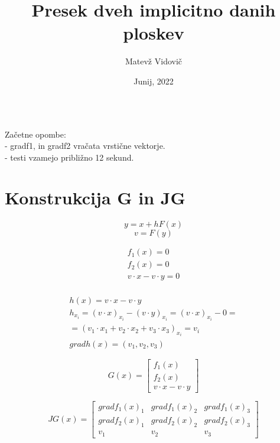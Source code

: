 \documentclass[12pt, letterpaper, twoside]{article}    %
\title{Presek dveh implicitno danih ploskev}
\author{Matevž Vidovič}
\date{Junij, 2022}
\begin{document}
\maketitle

$$$$

Začetne opombe: \\
- gradf1, in gradf2 vračata vrstične vektorje. \\
- testi vzamejo približno 12 sekund. \\

$$$$

\tableofcontents

\newpage



\section{Konstrukcija G in JG}
 
$$y = x + hF(x)$$
$$v = F(y)$$

\begin{equation}
\begin{split}
f_1(x) = 0 \\
f_2(x) = 0 \\
v \cdot x - v \cdot y = 0 \\
\end{split}
\end{equation}

\[
\begin{split}
h(x) = v \cdot x - v \cdot y \\
h_{x_i} = (v \cdot x)_{x_i} - (v \cdot y)_{x_i} = (v \cdot x)_{x_i} - 0 = \\
= (v_1 \cdot x_1 + v_2 \cdot x_2 + v_3 \cdot x_3)_{x_i} = v_i \\
grad h(x) = (v_1, v_2, v_3)
\end{split}
\]


\[
G(x) = 
	\begin{bmatrix}
		f_1(x) \\
		f_2(x) \\
		v \cdot x - v \cdot y		
	\end{bmatrix}
\]


\[
JG(x) = 
	\begin{bmatrix}
		grad f_1(x)_1 & grad f_1(x)_2 & grad f_1(x)_3 \\
		grad f_2(x)_1 & grad f_2(x)_2 & grad f_2(x)_3 \\
		v_1 & v_2 & v_3
	\end{bmatrix}
\]
\end{document}
